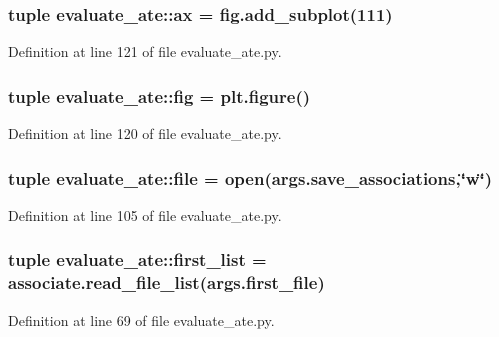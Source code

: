 \subsubsection[{ax}]{\setlength{\rightskip}{0pt plus 5cm}tuple {\bf evaluate\-\_\-ate\-::ax} = fig.\-add\-\_\-subplot(111)}\label{namespaceevaluate__ate_a8b4631f6686c05a943d71be14d1e531b}


\-Definition at line 121 of file evaluate\-\_\-ate.\-py.

\subsubsection[{fig}]{\setlength{\rightskip}{0pt plus 5cm}tuple {\bf evaluate\-\_\-ate\-::fig} = plt.\-figure()}\label{namespaceevaluate__ate_a40c0f2ea815bd39eae67b933ae0e019c}


\-Definition at line 120 of file evaluate\-\_\-ate.\-py.

\subsubsection[{file}]{\setlength{\rightskip}{0pt plus 5cm}tuple {\bf evaluate\-\_\-ate\-::file} = open(args.\-save\-\_\-associations,\char`\"{}w\char`\"{})}\label{namespaceevaluate__ate_a0888e5579627e46d6a6ec883c8dd0c3f}


\-Definition at line 105 of file evaluate\-\_\-ate.\-py.

\subsubsection[{first\-\_\-list}]{\setlength{\rightskip}{0pt plus 5cm}tuple {\bf evaluate\-\_\-ate\-::first\-\_\-list} = {\bf associate.\-read\-\_\-file\-\_\-list}(args.\-first\-\_\-file)}\label{namespaceevaluate__ate_ae79d1aeba92c80abc944e9a21ff48ae0}


\-Definition at line 69 of file evaluate\-\_\-ate.\-py.

